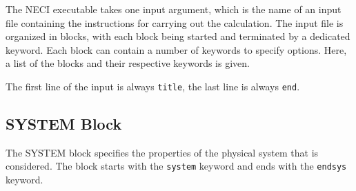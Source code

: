\documentclass[a4paper,notitlepage]{scrreprt}
\begin{document}
The NECI executable takes one input argument, which is the name of an input
file containing the instructions for carrying out the calculation. The input
file is organized in blocks, with each block being started and terminated by a
dedicated keyword. Each block can contain a number of keywords to specify
options. Here, a list of the blocks and their respective keywords is given.

The first line of the input is always \texttt{title}, the last line is always \texttt{end}.

\subsection{SYSTEM Block}
The SYSTEM block specifies the properties of the physical system that is
considered. The block starts with the \texttt{system} keyword and ends with
the \texttt{endsys} keyword. 
\end{document}
